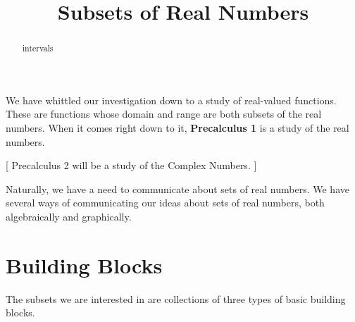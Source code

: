 \documentclass{ximera}
\title{Subsets of Real Numbers}
\begin{document}
\begin{abstract}
intervals
\end{abstract}
\maketitle




We have whittled our investigation down to a study of real-valued functions.  These are functions whose domain and range are both subsets of the real numbers.  When it comes right down to it, \textbf{Precalculus 1} is a study of the real numbers. 




[ Precalculus 2 will be a study of the Complex Numbers. ] 



Naturally, we have a need to communicate about sets of real numbers.  We have several ways of communicating our ideas about sets of real numbers, both algebraically and graphically.


\section*{Building Blocks}

The subsets we are interested in are collections of three types of basic building blocks.
\end{document}
